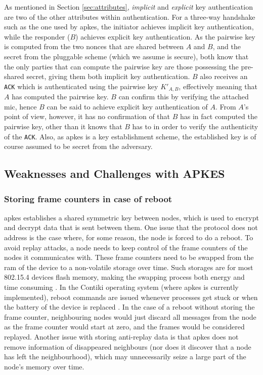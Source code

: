 As mentioned in Section \ref{sec:attributes}, \emph{implicit} and \emph{explicit} key authentication are two of the other attributes within authentication. For a three-way handshake such as the one used by \gls{apkes}, the initiator achieves implicit key authentication, while the responder ($B$) achieves explicit key authentication. As the pairwise key is computed from the two nonces that are shared between $A$ and $B$, and the secret from the pluggable scheme (which we assume is secure), both know that the only parties that can compute the pairwise key are those possessing the pre-shared secret, giving them both implicit key authentication. $B$ also receives an \texttt{ACK} which is authenticated using the pairwise key $K'_{A,B}$, effectively meaning that $A$ has computed the pairwise key. $B$ can confirm this by verifying the attached \gls{mic}, hence $B$ can be said to achieve explicit key authentication of $A$. From $A$'s point of view, however, it has no confirmation of that $B$ has in fact computed the pairwise key, other than it knows that $B$ has to in order to verify the authenticity of the \texttt{ACK}. Also, as \gls{apkes} is a key establishment scheme, the established key is of course assumed to be secret from the adversary.

\subsection{Weaknesses and Challenges with APKES}
\label{subsec:apkes-weakness}

\subsubsection{Storing frame counters in case of reboot}

\gls{apkes} establishes a shared symmetric key between nodes, which is used to encrypt and decrypt data that is sent between them. One issue that the protocol does not address is the case where, for some reason, the node is forced to do a reboot. To avoid replay attacks, a node needs to keep control of the frame counters of the nodes it communicates with. These frame counters need to be swapped from the \gls{ram} of the device to a non-volatile storage over time. Such storages are for most 802.15.4 devices flash memory, making the swapping process both energy and time consuming \cite{krentz2015handling}. In the Contiki operating system (where \gls{apkes} is currently implemented), reboot commands are issued whenever processes get stuck or when the battery of the device is replaced \cite{dunkels2004contiki}. In the case of a reboot without storing the frame counter, neighbouring nodes would just discard all messages from the node as the frame counter would start at zero, and the frames would be considered replayed. Another issue with storing anti-replay data is that \gls{apkes} does not remove information of disappeared neighbours (nor does it discover that a node has left the neighbourhood), which may unnecessarily seize a large part of the node's memory over time.  

